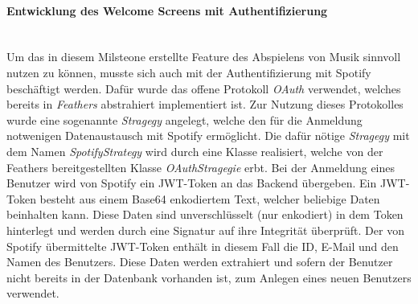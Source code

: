 \documentclass[10pt, a4paper]{article}
\begin{document}
\begin{onehalfspace}
\paragraph*{Entwicklung des Welcome Screens mit Authentifizierung} $~$ \\
Um das in diesem Milsteone erstellte Feature des Abspielens von Musik sinnvoll nutzen zu können, musste sich auch mit der Authentifizierung mit Spotify beschäftigt
werden. Dafür wurde das offene Protokoll \textit{OAuth} verwendet, welches bereits in \textit{Feathers} abstrahiert implementiert ist. Zur Nutzung dieses
Protokolles wurde eine sogenannte \textit{Stragegy} angelegt, welche den für die Anmeldung notwenigen Datenaustausch mit Spotify ermöglicht.
Die dafür nötige \textit{Stragegy} mit dem Namen \textit{SpotifyStrategy} wird durch eine Klasse realisiert, welche von der Feathers bereitgestellten Klasse
\textit{OAuthStragegie} erbt. Bei der Anmeldung eines Benutzer wird von Spotify ein JWT-Token an das Backend übergeben. Ein JWT-Token besteht aus einem Base64
enkodiertem Text, welcher beliebige Daten beinhalten kann. Diese Daten sind unverschlüsselt (nur enkodiert) in dem Token hinterlegt und werden
durch eine Signatur auf ihre Integrität überprüft. Der von Spotify übermittelte JWT-Token enthält in diesem Fall die ID, E-Mail und den Namen des
Benutzers. Diese Daten werden extrahiert und sofern der Benutzer nicht bereits in der Datenbank vorhanden ist, zum Anlegen eines neuen Benutzers verwendet.

\end{onehalfspace}
\end{document}
